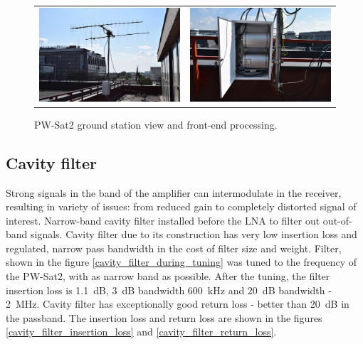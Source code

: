 \begin{figure}[h]
   \centering
\begin{tabular}{cc}
        \includegraphics[width=0.35\paperwidth]{img/7/elka_view.jpg}
    & 
        \includegraphics[width=0.35\paperwidth]{img/7/elka_skrzynka.jpg}
\end{tabular}
\label{elka_skrzynka}
\caption{PW-Sat2 ground station view and front-end processing.}
\end{figure}

\subsection{Cavity filter}
Strong signals in the band of the amplifier can intermodulate in the receiver, resulting in variety of issues: from reduced gain to completely distorted signal of interest. Narrow-band cavity filter installed before the LNA to filter out out-of-band signals. Cavity filter due to its construction has very low insertion loss and regulated, narrow pass bandwidth in the cost of filter size and weight. Filter, shown in the figure \ref{cavity_filter_during_tuning} was tuned to the frequency of the PW-Sat2, with as narrow band as possible. After the tuning, the filter insertion loss is \SI{1.1}{\dB}, \SI{3}{\dB} bandwidth \SI{600}{\kHz} and \SI{20}{\dB} bandwidth - \SI{2}{\MHz}. Cavity filter has exceptionally good return loss - better than \SI{20}{\dB} in the passband. The insertion loss and return loss are shown in the figures \ref{cavity_filter_insertion_loss} and \ref{cavity_filter_return_loss}.

